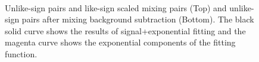 {\begin{figure}
\begin{center}
	 \\
	\vspace{0.5cm}
\end{center}
	\caption{Unlike-sign pairs and like-sign scaled mixing pairs (Top) and  unlike-sign pairs after mixing background subtraction (Bottom). The black solid curve shows the results of signal+exponential fitting and the magenta curve shows the exponential components of the fitting function.  }
\label{fig_4_ulsbglsscale}
\end{figure}
\clearpage
\begin{figure}
\begin{center}
	 \hspace{2mm}

\end{center}
\end{figure}}

